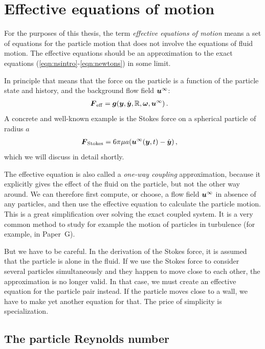 \documentclass[thesis.tex]{subfiles}
\begin{document}
\section{Effective equations of motion}

For the purposes of this thesis, the term \emph{effective equations of motion} means a set of equations for the particle motion that does not involve the equations of fluid motion. The effective equations should be an approximation to the exact equations (\ref{eqn:nsintro}-\ref{eqn:newtons}) in some limit.

In principle that means that the force on the particle is a function of the particle state and history, and the background flow field $\mbox{\boldmath$u$}^\infty$:
\begin{align}
	\mbox{\boldmath$F$}_{\mathrm{eff}} &= \mbox{\boldmath$g$}(\mbox{\boldmath$y$}, \dot{\mbox{\boldmath$y$}}, \mathbb{R}, \mbox{\boldmath$\omega$}, \mbox{\boldmath$u$}^\infty)\,.
\end{align}
A concrete and well-known example is the Stokes force on a spherical particle of radius $a$
\begin{align}
	\ve F_{\mathrm{Stokes}} &= 6\pi\mu a (\ve u^\infty(\ve y, t)-\dot{\ve y})\,,\eqnlab{stokesforce}
\end{align}
which we will discuss in detail shortly.

The effective equation is also called a \emph{one-way coupling} approximation, because it explicitly gives the effect of the fluid on the particle, but not the other way around. We can therefore first compute, or choose, a flow field $\mbox{\boldmath$u$}^\infty$ in absence of any particles, and then use the effective equation to calculate the particle motion. This is a great simplification over solving the exact coupled system. It is a very common method to study for example the motion of particles in turbulence (for example, in Paper~G).

But we have to be careful. In the derivation of the Stokes force, it is assumed that the particle is alone in the fluid. If we use the Stokes force to consider several particles simultaneously and they happen to move close to each other, the approximation is no longer valid. In that case, we must create an effective equation for the particle pair instead. If the particle moves close to a wall, we have to make yet another equation for that. The price of simplicity is specialization.

\subsection{The particle Reynolds number}
\end{document}

